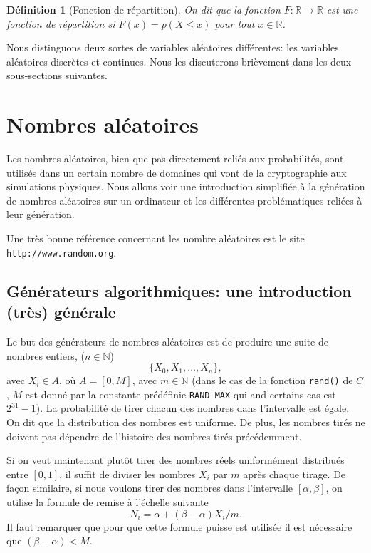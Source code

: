 \documentclass[a4paper,12pt]{book}
\newcommand{\real}{\mathbb{R}}
\renewcommand{\natural}{\mathbb{N}}
\newtheorem{definition}{Définition}
\begin{document}
\begin{definition}[Fonction de répartition] On dit que la fonction $F:\real\rightarrow\real$ est une \textit{fonction de répartition}
si $F(x)=p(X\leq x)$ pour tout $x\in\real$.
\end{definition}

Nous distinguons deux sortes de variables aléatoires différentes: les variables aléatoires discrètes et continues. Nous les discuterons brièvement dans les deux sous-sections suivantes.


\section{Nombres aléatoires}

Les nombres aléatoires, bien que pas directement reliés aux probabilités, sont utilisés dans un certain nombre de domaines
qui vont de la cryptographie aux simulations physiques. Nous allons voir une introduction simplifiée à la génération de nombres aléatoires
sur un ordinateur et les différentes problématiques reliées à leur génération.

Une très bonne référence concernant les nombre aléatoires est le site \break \texttt{http://www.random.org}.

\subsection{Générateurs algorithmiques: une introduction (très) générale}

Le but des générateurs de nombres aléatoires est de produire une suite de nombres entiers,
($n\in\natural$)
\begin{equation*}
 \{X_0,X_1,...,X_n\},
\end{equation*}
avec $X_i\in A$, où $A=[0,M]$, avec $m\in \natural$ (dans le cas de la fonction \texttt{rand()}
de $C$, $M$ est donné par la constante prédéfinie \texttt{RAND\_MAX} qui and certains cas est $2^{31}-1$). La probabilité 
de tirer chacun des nombres dans l'intervalle est égale. On dit que la distribution des nombres est uniforme.
De plus, les nombres tirés ne doivent pas dépendre de l'histoire des nombres tirés précédemment. 

Si on veut maintenant plutôt tirer des nombres réels uniformément distribués entre $[0,1]$, il suffit
de diviser les nombres $X_i$ par $m$ après chaque tirage. De façon similaire, si nous voulons 
tirer des nombres dans l'intervalle $[\alpha,\beta]$, on utilise la formule de remise à l'échelle suivante
\begin{equation}
 N_i=\alpha+(\beta-\alpha)X_i/m.
\end{equation}
Il faut remarquer que pour que cette formule puisse est utilisée il est nécessaire que $(\beta-\alpha)<M$.
\end{document}
